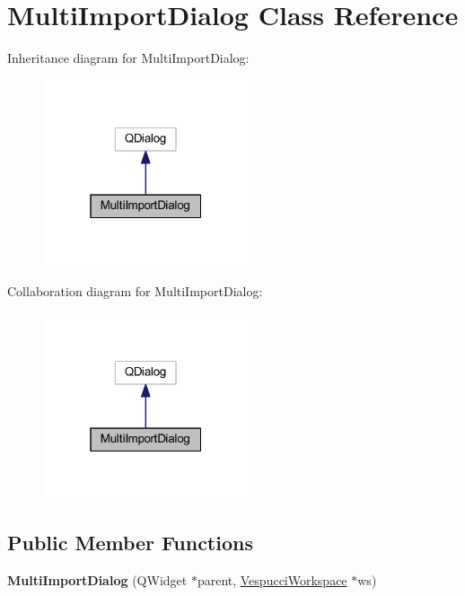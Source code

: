 \hypertarget{class_multi_import_dialog}{\section{Multi\+Import\+Dialog Class Reference}
\label{class_multi_import_dialog}
}


Inheritance diagram for Multi\+Import\+Dialog\+:\nopagebreak
\begin{figure}[H]
\begin{center}
\leavevmode
\includegraphics[width=172pt]{class_multi_import_dialog__inherit__graph}
\end{center}
\end{figure}


Collaboration diagram for Multi\+Import\+Dialog\+:\nopagebreak
\begin{figure}[H]
\begin{center}
\leavevmode
\includegraphics[width=172pt]{class_multi_import_dialog__coll__graph}
\end{center}
\end{figure}
\subsection*{Public Member Functions}
\begin{DoxyCompactItemize}
\item 
\hypertarget{class_multi_import_dialog_aa4cccc730741a0e1b195266dec3dd9fe}{{\bfseries Multi\+Import\+Dialog} (Q\+Widget $\ast$parent, \hyperlink{class_vespucci_workspace}{Vespucci\+Workspace} $\ast$ws)}\label{class_multi_import_dialog_aa4cccc730741a0e1b195266dec3dd9fe}

\end{DoxyCompactItemize}


